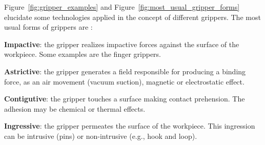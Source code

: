 Figure~\ref{fig:gripper_examples} and Figure~\ref{fig:most_usual_gripper_forms} elucidate some technologies applied in the concept of different
grippers. The most usual forms of grippers are \cite{monkman2007robot}:

\begin{itemize_jp}
    \item \textbf{Impactive}: the gripper realizes impactive forces against the surface of the workpiece. Some examples are the finger grippers.
    
    \item \textbf{Astrictive}: the gripper generates a field responsible for producing a binding force, as an air movement (vacuum suction), magnetic or electrostatic effect.
    
    \item \textbf{Contigutive}: the gripper touches a surface making contact prehension. The adhesion may be chemical or thermal effects.
    
    \item \textbf{Ingressive}: the gripper permeates the surface of the workpiece. This ingression can be intrusive (pins) or non-intrusive (e.g., hook and loop).    
\end{itemize_jp}


